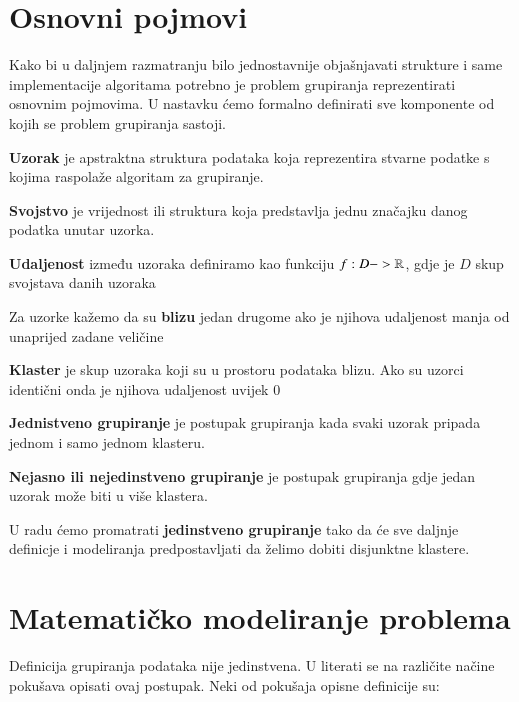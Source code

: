 \documentclass[a4paper,twoside,12pt]{memoir} %
\begin{document}
\section[Osnovni pojmovi][os-pojmovi]{Osnovni pojmovi}
\label{sec:os-pojmovi}
Kako bi u daljnjem razmatranju bilo jednostavnije objašnjavati strukture i same implementacije algoritama potrebno je problem grupiranja reprezentirati osnovnim pojmovima. U nastavku ćemo formalno definirati sve komponente od kojih se problem grupiranja sastoji.
\begin{defn}
\label{def:uzorak}
\textbf{Uzorak} je apstraktna struktura podataka koja reprezentira stvarne podatke s kojima raspolaže algoritam za grupiranje.
\end{defn}
\begin{defn}
\label{def:svojstvo}
\textbf{Svojstvo} je vrijednost ili struktura koja predstavlja jednu značajku danog podatka unutar uzorka.
\end{defn}
\begin{defn}
\label{def:udaljenost}
\textbf{Udaljenost} između uzoraka definiramo kao funkciju 
$f: D  -> \mathbb{R}$, gdje je $D$ skup svojstava danih uzoraka
\end{defn}
\begin{defn}
\label{def:blizina}
Za uzorke kažemo da su \textbf{blizu} jedan drugome ako je njihova udaljenost manja od unaprijed zadane veličine
\end{defn}
\begin{defn}
\label{def:klaster}
\textbf{Klaster} je skup uzoraka koji su u prostoru podataka blizu. Ako su uzorci identični onda je njihova udaljenost uvijek $0$
\end{defn}
\begin{defn}
\label{def:hard}
\textbf{Jednistveno grupiranje} je postupak grupiranja kada svaki uzorak pripada jednom i samo jednom klasteru.
\end{defn}
\begin{defn}
\label{def:fuzzy}
\textbf{Nejasno ili nejedinstveno grupiranje} je postupak grupiranja gdje jedan uzorak može biti u više klastera.
\end{defn}
\begin{rem}
U radu ćemo promatrati \textbf{jedinstveno grupiranje} tako da će sve daljnje definicje i modeliranja predpostavljati da želimo dobiti disjunktne klastere.
\end{rem}

\section[Matematičko modeliranje problema][Matematičko modeliranje]{Matematičko modeliranje problema}
Definicija grupiranja podataka nije jedinstvena. U literati se na različite načine pokušava opisati ovaj postupak. Neki od pokušaja opisne definicije su:
\end{document}
